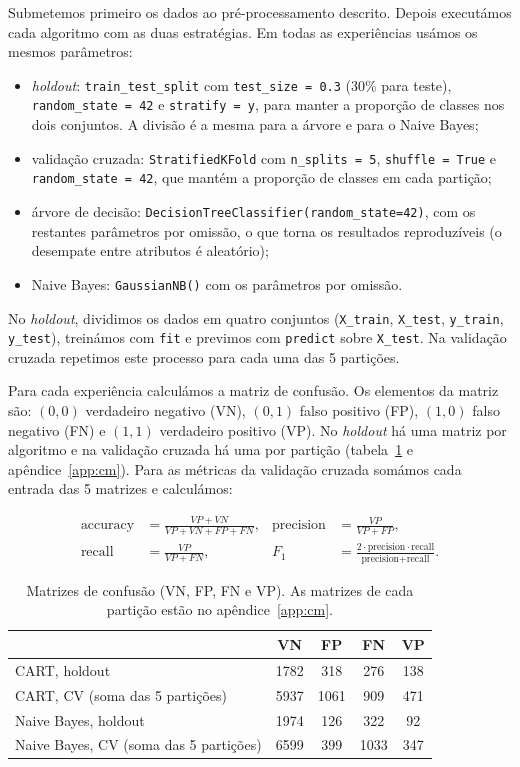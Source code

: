 \documentclass[12pt,a4paper]{article}
\newcommand{\code}[1]{\texttt{#1}}
\begin{document}
Submetemos primeiro os dados ao pré-processamento descrito. Depois executámos cada algoritmo com as duas estratégias. Em todas as experiências usámos os mesmos parâmetros:

\begin{itemize}[noitemsep]
  \item \emph{holdout}: \code{train\_test\_split} com \code{test\_size = 0.3} (30\% para teste), \code{random\_state = 42} e \code{stratify = y}, para manter a proporção de classes nos dois conjuntos. A divisão é a mesma para a árvore e para o Naive Bayes;
  \item validação cruzada: \code{StratifiedKFold} com \code{n\_splits = 5}, \code{shuffle = True} e \code{random\_state = 42}, que mantém a proporção de classes em cada partição;
  \item árvore de decisão: \code{DecisionTreeClassifier(random\_state=42)}, com os restantes parâmetros por omissão, o que torna os resultados reproduzíveis (o desempate entre atributos é aleatório);
  \item Naive Bayes: \code{GaussianNB()} com os parâmetros por omissão.
\end{itemize}

No \emph{holdout}, dividimos os dados em quatro conjuntos (\code{X\_train}, \code{X\_test}, \code{y\_train}, \code{y\_test}), treinámos com \code{fit} e previmos com \code{predict} sobre \code{X\_test}. Na validação cruzada repetimos este processo para cada uma das 5 partições.

Para cada experiência calculámos a matriz de confusão. Os elementos da matriz são: $(0,0)$ verdadeiro negativo (VN), $(0,1)$ falso positivo (FP), $(1,0)$ falso negativo (FN) e $(1,1)$ verdadeiro positivo (VP). No \emph{holdout} há uma matriz por algoritmo e na validação cruzada há uma por partição (tabela~\ref{tab:cm} e apêndice~\ref{app:cm}). Para as métricas da validação cruzada somámos cada entrada das 5 matrizes e calculámos:

\begin{align*}
  \text{accuracy} &= \frac{VP+VN}{VP+VN+FP+FN}, & \text{precision} &= \frac{VP}{VP+FP},\\
  \text{recall} &= \frac{VP}{VP+FN}, & F_1 &= \frac{2\cdot\text{precision}\cdot\text{recall}}{\text{precision}+\text{recall}}.
\end{align*}

\begin{table}[H]
  \centering
  \small
  \begin{tabular}{lcccc}
    \toprule
     & VN & FP & FN & VP \\
    \midrule
    CART, holdout   & 1782 & 318 & 276 & 138 \\
    CART, CV (soma das 5 partições)  & 5937 & 1061 & 909 & 471 \\
    Naive Bayes, holdout  & 1974 & 126 & 322 & 92 \\
    Naive Bayes, CV (soma das 5 partições)  & 6599 & 399 & 1033 & 347 \\
    \bottomrule
  \end{tabular}
  \caption{Matrizes de confusão (VN, FP, FN e VP). As matrizes de cada partição estão no apêndice~\ref{app:cm}.}
  \label{tab:cm}
\end{table}
\end{document}
